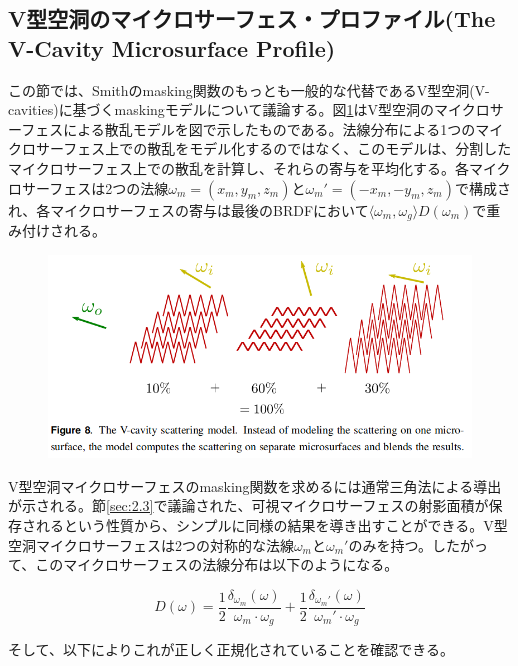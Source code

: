 \documentclass[a4j,xelatex,ja=standard]{bxjsarticle}
\begin{document}
\subsection{V型空洞のマイクロサーフェス・プロファイル(The V-Cavity Microsurface Profile)}

この節では、Smithのmasking関数のもっとも一般的な代替であるV型空洞(V-cavities)\cite{Cook1982,Oren1994}に基づくmaskingモデルについて議論する。図\ref{fig:8}はV型空洞のマイクロサーフェスによる散乱モデルを図で示したものである。法線分布による1つのマイクロサーフェス上での散乱をモデル化するのではなく、このモデルは、分割したマイクロサーフェス上での散乱を計算し、それらの寄与を平均化する。各マイクロサーフェスは2つの法線$\omega_m = (x_m, y_m, z_m)$と$\omega_m' = (-x_m, -y_m, z_m)$で構成され、各マイクロサーフェスの寄与は最後のBRDFにおいて$\langle \omega_m, \omega_g \rangle D(\omega_m)$で重み付けされる。

\begin{figure}
    \includegraphics[width=\textwidth]{Figure8.png}
    \caption{}
    \label{fig:8}
\end{figure}

V型空洞マイクロサーフェスのmasking関数を求めるには通常三角法による導出が示される。節\ref{sec:2.3}で議論された、可視マイクロサーフェスの射影面積が保存されるという性質から、シンプルに同様の結果を導き出すことができる。V型空洞マイクロサーフェスは2つの対称的な法線$\omega_m$と$\omega_m'$のみを持つ。したがって、このマイクロサーフェスの法線分布は以下のようになる。

\begin{equation}
    D(\omega) = \frac{1}{2} \frac{\delta_{\omega_m}(\omega)}{\omega_m \cdot \omega_g} + \frac{1}{2} \frac{\delta_{\omega_m'}(\omega)}{\omega_m' \cdot \omega_g}
    \label{eq:44}
\end{equation}

そして、以下によりこれが正しく正規化されていることを確認できる。
\end{document}
